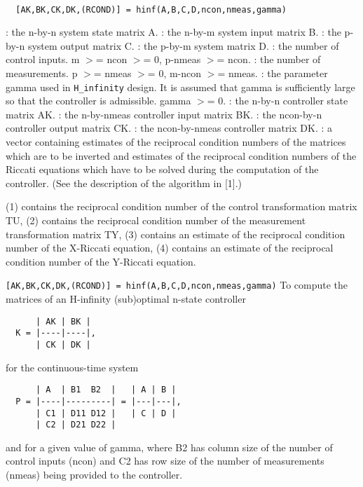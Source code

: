 \begin{mandesc}
   \\ %
\end{mandesc}
\begin{calling_sequence}
\begin{verbatim}
  [AK,BK,CK,DK,(RCOND)] = hinf(A,B,C,D,ncon,nmeas,gamma)  
\end{verbatim}
\end{calling_sequence}
\begin{parameters}
  \begin{varlist}
    : the n-by-n system state matrix A.
    : the n-by-m system input matrix B.
    : the p-by-n system output matrix C.
    : the p-by-m system matrix D.
    : the number of control inputs. m $>$= ncon $>$= 0, p-nmeas $>$= ncon.
    : the number of measurements. p $>$= nmeas $>$= 0, m-ncon $>$= nmeas.
    : the parameter gamma used in \verb!H_infinity! design. 
    It is assumed that gamma is sufficiently large so that the controller is admissible. gamma $>$= 0.
    : the n-by-n controller state matrix AK.
    : the n-by-nmeas controller input matrix BK.
    : the ncon-by-n controller output matrix CK.
    : the ncon-by-nmeas controller matrix DK.
    : a vector containing estimates of the reciprocal condition numbers of the matrices which are to be inverted and estimates of the reciprocal condition numbers of the Riccati equations which have to be solved during the computation of the controller. (See the description of the algorithm in [1].)
    \begin{varlist}
       (1) contains the reciprocal condition number of the  control transformation matrix TU,
       (2) contains the reciprocal condition number of the  measurement transformation matrix TY,
       (3) contains an estimate of the reciprocal condition number of the X-Riccati equation,
       (4) contains an estimate of the reciprocal condition number of the Y-Riccati equation.
    \end{varlist}
  \end{varlist}
\end{parameters}
\begin{mandescription}
  \verb![AK,BK,CK,DK,(RCOND)] = hinf(A,B,C,D,ncon,nmeas,gamma)!
  To compute the matrices of an H-infinity (sub)optimal n-state
  controller
\begin{verbatim}
      | AK | BK |
  K = |----|----|,
      | CK | DK |
\end{verbatim}
for the continuous-time system
\begin{verbatim}
      | A  | B1  B2  |   | A | B |
  P = |----|---------| = |---|---|,
      | C1 | D11 D12 |   | C | D | 
      | C2 | D21 D22 |
\end{verbatim}
and for a given value of gamma, where B2 has column size of the
number of control inputs (ncon) and C2 has row size of the number
of measurements (nmeas) being provided to the controller.
\end{mandescription}
